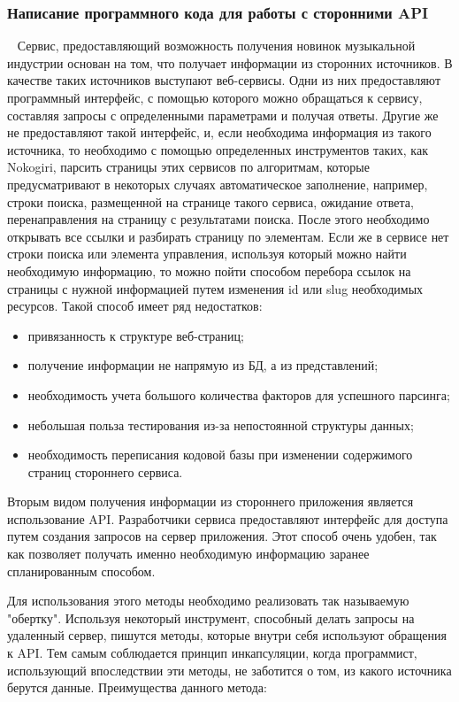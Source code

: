 \subsubsection{Написание программного кода для работы с сторонними API}
\label{sub:arch_and_mod:mvc:controller}
~\newline
\indent Сервис, предоставляющий возможность получения новинок музыкальной индустрии основан на том, что получает информации из сторонних источников. В качестве таких источников выступают веб-сервисы. Одни из них предоставляют программный интерфейс, с помощью которого можно обращаться к сервису, составляя запросы с определенными параметрами и получая ответы. Другие же не предоставляют такой интерфейс, и, если необходима информация из такого источника, то необходимо с помощью определенных инструментов таких, как Nokogiri, парсить страницы этих сервисов по алгоритмам, которые предусматривают в некоторых случаях автоматическое заполнение, например, строки поиска, размещенной на странице такого сервиса, ожидание ответа, перенаправления на страницу с результатами поиска. После этого необходимо открывать все ссылки и разбирать страницу по элементам. Если же в сервисе нет строки поиска или элемента управления, используя который можно найти необходимую информацию, то можно пойти способом перебора ссылок на страницы с нужной информацией путем изменения id или slug необходимых ресурсов. Такой способ имеет ряд недостатков:

\begin{itemize}
  \item привязанность к структуре веб-страниц;
  \item получение информации не напрямую из БД, а из представлений;
  \item необходимость учета большого количества факторов для успешного парсинга;
  \item небольшая польза тестирования из-за непостоянной структуры данных;
  \item необходимость переписания кодовой базы при изменении содержимого страниц стороннего сервиса.
\end{itemize}

Вторым видом получения информации из стороннего приложения является использование API. Разработчики сервиса предоставляют интерфейс для доступа путем создания запросов на сервер приложения. Этот способ очень удобен, так как позволяет получать именно необходимую информацию заранее спланированным способом.

Для использования этого методы необходимо реализовать так называемую "обертку". Используя некоторый инструмент, способный делать запросы на удаленный сервер, пишутся методы, которые внутри себя используют обращения к API. Тем самым соблюдается принцип инкапсуляции, когда программист, использующий впоследствии эти методы, не заботится о том, из какого источника берутся данные. Преимущества данного метода:

